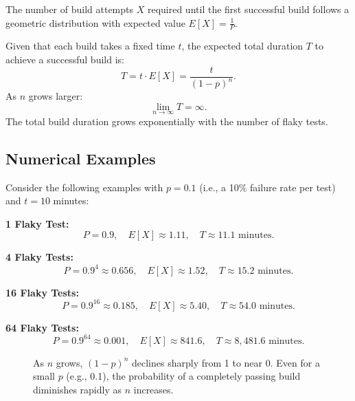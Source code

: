 \documentclass[letterpaper]{article}
\begin{document}
The number of build attempts \( X \) required until the first successful build follows a geometric distribution with expected value \(E[X] = \frac{1}{P}\).

Given that each build takes a fixed time \( t \), the expected total duration \( T \) to achieve a successful build is:
\[
T = t \cdot E[X] = \frac{t}{(1 - p)^n}.
\]
As \( n \) grows larger:
\[
\lim_{n \to \infty} T = \infty.
\]
The total build duration grows exponentially with the number of flaky tests.

\subsection{Numerical Examples}

Consider the following examples with \( p = 0.1 \) (i.e., a 10\% failure rate per test) and \( t = 10 \) minutes:

\textbf{1 Flaky Test:}
\[
P = 0.9, \quad E[X] \approx 1.11, \quad T \approx 11.1 \text{ minutes}.
\]

\textbf{4 Flaky Tests:}
\[
P = 0.9^{4} \approx 0.656, \quad E[X] \approx 1.52, \quad T \approx 15.2 \text{ minutes}.
\]

\textbf{16 Flaky Tests:}
\[
P = 0.9^{16} \approx 0.185, \quad E[X] \approx 5.40, \quad T \approx 54.0 \text{ minutes}.
\]

\textbf{64 Flaky Tests:}
\[
P = 0.9^{64} \approx 0.001, \quad E[X] \approx 841.6, \quad T \approx 8,481.6 \text{ minutes}.
\]

\begin{figure}[ht!]
    \centering
    \caption{As \( n \) grows, \((1-p)^n\) declines sharply from 1 to near 0. Even for a small \( p \) (e.g., 0.1), the probability of a completely passing build diminishes rapidly as \( n \) increases.}
\end{figure}

\pagebreak
\end{document}

